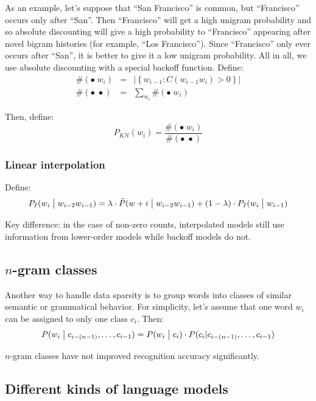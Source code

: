 \documentclass[11pt]{article}
\begin{document}
As an example, let's suppose that ``San Francisco'' is common, but ``Francisco'' occurs only after ``San''. Then ``Francisco'' will get a high unigram probability and so absolute discounting will give a high probability to ``Francisco'' appearing after novel bigram histories (for example, ``Los Francisco''). Since ``Francisco'' only ever occurs after ``San'', it is better to give it a low unigram probability. All in all, we use absolute discounting with a special backoff function. Define:
\begin{eqnarray*}
    \#(\bullet \; w_i) &=& \left|\left\{w_{i-1} : C(w_{i-1}w_i) > 0 \right\}\right| \\
    \#(\bullet \; \bullet) &=& \sum\limits_{w_i} \#(\bullet \; w_i)
\end{eqnarray*}

Then, define:
\[
    P_{KN}(w_i) = \frac{\#(\bullet \; w_i)}{\#(\bullet \; \bullet)}
\]

\subsubsection{Linear interpolation}

Define:
\[
    P_I(w_i \bigm| w_{i-2}w_{i-1}) = \lambda \cdot \tilde{P}(w+i \bigm| w_{i-2}w_{i-1}) + (1 - \lambda) \cdot P_I(w_{i} \bigm| w_{i-1})
\]

Key difference: in the case of non-zero counts, interpolated models still use information from lower-order models while backoff models do not.

\subsection{$n$-gram classes}

Another way to handle data sparsity is to group words into classes of similar semantic or grammatical behavior. For simplicity, let's assume that one word $w_i$ can be assigned to only one class $c_i$. Then:
\[
    P(w_i \bigm| c_{i-(n-1)}, \ldots, c_{i-1}) = P(w_i \bigm| c_i) \cdot P(c_i | c_{i-(n-1)}, \ldots, c_{i-1})
\]

$n$-gram classes have not improved recognition accuracy significantly.

\subsection{Different kinds of language models}
\end{document}
